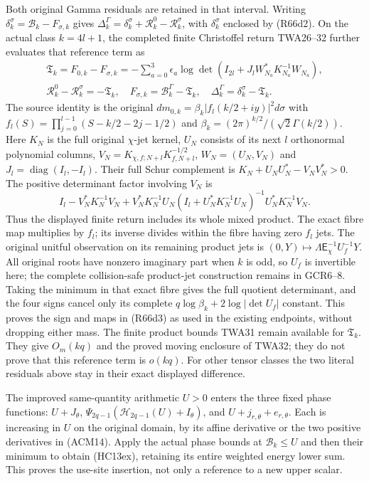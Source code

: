 Both original Gamma residuals are retained in that interval.
Writing
$\delta_k^\sigma=\mathcal B_k-F_{\sigma,k}$ gives
$\Delta_k^\Gamma=\delta_k^\sigma+
\mathcal R_k^0-\mathcal R_k^\sigma$, with
$\delta_k^\sigma$ enclosed by (R66d2).
On the actual class $k=4l+1$, the completed finite
Christoffel return TWA26--32 further evaluates that
reference term as
\[
\begin{gathered}
 \mathfrak T_k=F_{0,k}-F_{\sigma,k}
    =-\sum_{a=0}^3\epsilon_a
       \log\det(I_{2l}+J_lW_{N_a}^*K_{N_a}^{-1}W_{N_a}),\\
 \mathcal R_k^0-\mathcal R_k^\sigma=-\mathfrak T_k,\quad
 F_{\sigma,k}=\mathcal B_k^\Gamma-\mathfrak T_k,\quad
 \Delta_k^\Gamma=\delta_k^\sigma-\mathfrak T_k .
\end{gathered}\tag{R66d3}
\]
The source identity is the original
$dm_{0,k}=\beta_k|f_l(k/2+iy)|^2d\sigma$ with
$f_l(S)=\prod_{j=0}^{l-1}(S-k/2-2j-1/2)$ and
$\beta_k=(2\pi)^{k/2}/(\sqrt2\Gamma(k/2))$.
Here $K_N$ is the full original $\chi$-jet kernel,
$U_N$ consists of its next $l$ orthonormal polynomial
columns,
$V_N=K_{\chi,f;N+l}K_{f,N+l}^{-1/2}$,
$W_N=(U_N,V_N)$ and $J_l=\operatorname{diag}(I_l,-I_l)$.
Their full Schur complement is
$K_N+U_NU_N^*-V_NV_N^*>0$.
The positive determinant factor involving $V_N$ is
\[
 I_l-V_N^*K_N^{-1}V_N+
 V_N^*K_N^{-1}U_N(I_l+U_N^*K_N^{-1}U_N)^{-1}
                         U_N^*K_N^{-1}V_N .
\]
Thus the displayed finite return includes its whole
mixed product. The exact fibre map multiplies by $f_l$;
its inverse divides within the fibre having zero $f_l$
jets. The original unitful observation on its remaining
product jets is
$(0,Y)\mapsto\Lambda\mathsf E_\chi^{-1}U_f^{-1}Y$.
All original roots have nonzero imaginary part when
$k$ is odd, so $U_f$ is invertible here; the complete
collision-safe product-jet construction remains in GCR6--8.
Taking the minimum in that exact fibre gives the full
quotient determinant, and the four signs cancel only
its complete $q\log\beta_k+2\log|\det U_f|$ constant.
This proves the sign and maps in (R66d3) as used in
the existing endpoints, without dropping either mass.
The finite product bounds TWA31 remain available for
$\mathfrak T_k$. They give $O_m(kq)$ and the proved
moving enclosure of TWA32; they do not prove that
this reference term is $o(kq)$.
For other tensor classes the two literal residuals
above stay in their exact displayed difference.

The improved same-quantity arithmetic $U>0$ enters
the three fixed phase functions:
$U+J_\theta$, $\Psi_{2q-1}(\mathscr H_{2q-1}(U)+I_\theta)$,
and $U+j_{r,\theta}+e_{r,\theta}$.
Each is increasing in $U$ on the original domain, by its
affine derivative or the two positive derivatives in (ACM14).
Apply the actual phase bounds at $\mathcal B_k\leq U$ and
then their minimum to obtain (HC13ex), retaining its entire
weighted energy lower sum. This proves the use-site insertion,
not only a reference to a new upper scalar.

